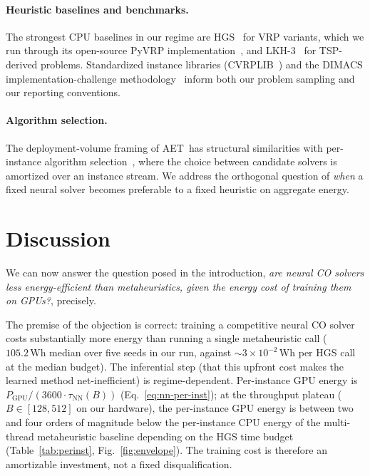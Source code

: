 \documentclass[11pt]{article}
\newcommand{\AET}{AET}
\begin{document}
\paragraph{Heuristic baselines and benchmarks.} The strongest CPU
baselines in our regime are HGS~\cite{vidal2012hgs,vidal2022hgs} for VRP variants, which we run through its open-source PyVRP implementation~\cite{wouda2024pyvrp}, and LKH-3~\cite{helsgaun2017lkh} for TSP-derived problems. Standardized instance libraries (CVRPLIB~\cite{cvrplib}) and the DIMACS implementation-challenge methodology~\cite{johnson1996experimental} inform both our problem sampling and our reporting conventions.

\paragraph{Algorithm selection.} The deployment-volume framing of
\AET\ has structural similarities with per-instance algorithm selection~\cite{tornede2023algorithm}, where the choice between candidate solvers is amortized over an instance stream. We address the orthogonal question of \emph{when} a fixed neural solver becomes preferable to a fixed heuristic on aggregate energy.

\section{Discussion}
\label{sec:discussion}

We can now answer the question posed in the introduction, \emph{are neural CO solvers less energy-efficient than metaheuristics, given the energy cost of training them on GPUs?}, precisely.

The premise of the objection is correct: training a competitive neural CO solver costs substantially more energy than running a single metaheuristic call (\(105.2\,\mathrm{Wh}\) median over five seeds in our run, against \(\sim\!3\times10^{-2}\,\mathrm{Wh}\) per HGS call at the median budget). The inferential step (that this upfront cost makes the learned method net-inefficient) is regime-dependent. Per-instance GPU energy is $P_\text{GPU} / (3600 \cdot \tau_\text{NN}(B))$ (Eq.~\eqref{eq:nn-per-inst}); at the throughput plateau (\(B \in [128, 512]\) on our hardware), the per-instance GPU energy is between two and four orders of magnitude below the per-instance CPU energy of the multi-thread metaheuristic baseline depending on the HGS time budget (Table~\ref{tab:perinst}, Fig.~\ref{fig:envelope}). The training cost is therefore an amortizable investment, not a fixed disqualification.
\end{document}
